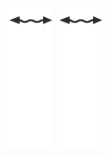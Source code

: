\documentclass[14pt]{extarticle}
\begin{document}
\begin{figure}[h!]
   	\includegraphics[width=1.2cm]{itrenzas/flechac.png}
   	\includegraphics[width=1.2cm]{itrenzas/flechac.png}

\end{figure}
\end{document}
